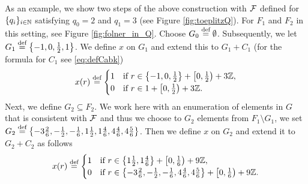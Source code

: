 As an example, we show two steps of the above construction with $\operatorname{\mathcal{F}}$ defined for $\{q_i\}_{i\in\mathbb{N}}$ satisfying $q_0=2$ and $q_1=3$ (see Figure \ref{fig:toeplitzQ}). For $F_1$ and $F_2$ in this setting, see Figure \ref{fig:folner_in_Q}. Choose $G_0\stackrel{\textup{def}}{=} \emptyset$.
%
Subsequently, we let $G_1\stackrel{\textup{def}}{=}\left\{-1, 0, \frac{1}{2},1 \right\}$. We define $x$ on $G_1$ and extend this to $G_1+C_1$ (for the formula for $C_1$ see \eqref{eq:defCabk})
\[
x(r)\stackrel{\textup{def}}{=} \begin{cases}1 & \text{if } r\in\left\{-1, 0, \frac{1}{2}\right\}+\left[0,\frac{1}{2}\right) + 3\mathbb{Z}, \\ 0  & \text{if } r\in 1+\left[0,\frac{1}{2}\right)+3\mathbb{Z}. \end{cases}
\]
Next, we define $G_2\subseteq F_2$. We work here with an enumeration of elements in $G$ that is consistent with $\operatorname{\mathcal{F}}$ and thus we choose to $G_2$ elements from $F_1\setminus G_1$, we set $G_2\stackrel{\textup{def}}{=}\left\{-3\frac{2}{6},-\frac{1}{2}, -\frac{1}{6}, 1\frac{1}{2}, 1\frac{4}{6}, 4\frac{4}{6}, 4\frac{5}{6} \right\}$. Then we define $x$ on $G_2$ and extend it to $G_2 +C_2$ as follows
\[
x(r)\stackrel{\textup{def}}{=} \begin{cases}1 & \text{if } r\in\left\{1\frac{1}{2}, 1\frac{4}{6}\right\}+\left[0,\frac{1}{6}\right) + 9\mathbb{Z}, \\ 0  & \text{if } r\in\left\{-3\frac{2}{6}, -\frac{1}{2},-\frac{1}{6},4\frac{4}{6}, 4\frac{5}{6}\right\}+\left[0,\frac{1}{6}\right)+9\mathbb{Z}. \end{cases}
\]

